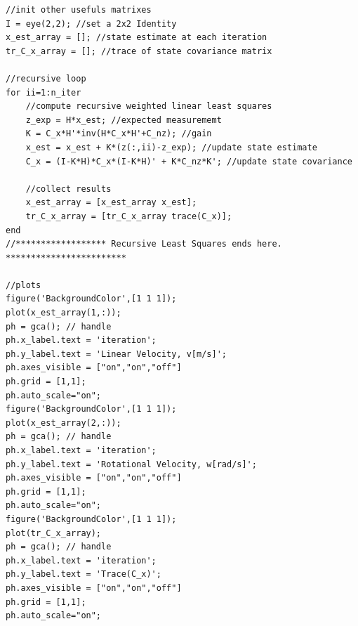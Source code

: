 \begin{mdframed}
\begin{verbatim}
//init other usefuls matrixes
I = eye(2,2); //set a 2x2 Identity
x_est_array = []; //state estimate at each iteration
tr_C_x_array = []; //trace of state covariance matrix

//recursive loop
for ii=1:n_iter
    //compute recursive weighted linear least squares
    z_exp = H*x_est; //expected measurememt
    K = C_x*H'*inv(H*C_x*H'+C_nz); //gain
    x_est = x_est + K*(z(:,ii)-z_exp); //update state estimate
    C_x = (I-K*H)*C_x*(I-K*H)' + K*C_nz*K'; //update state covariance
    
    //collect results
    x_est_array = [x_est_array x_est]; 
    tr_C_x_array = [tr_C_x_array trace(C_x)];
end
//****************** Recursive Least Squares ends here. ************************

//plots
figure('BackgroundColor',[1 1 1]);
plot(x_est_array(1,:));
ph = gca(); // handle
ph.x_label.text = 'iteration';
ph.y_label.text = 'Linear Velocity, v[m/s]';
ph.axes_visible = ["on","on","off"]
ph.grid = [1,1];
ph.auto_scale="on";
figure('BackgroundColor',[1 1 1]);
plot(x_est_array(2,:));
ph = gca(); // handle
ph.x_label.text = 'iteration';
ph.y_label.text = 'Rotational Velocity, w[rad/s]';
ph.axes_visible = ["on","on","off"]
ph.grid = [1,1];
ph.auto_scale="on";
figure('BackgroundColor',[1 1 1]);
plot(tr_C_x_array);
ph = gca(); // handle
ph.x_label.text = 'iteration';
ph.y_label.text = 'Trace(C_x)';
ph.axes_visible = ["on","on","off"]
ph.grid = [1,1];
ph.auto_scale="on";
\end{verbatim} 
\end{mdframed}

